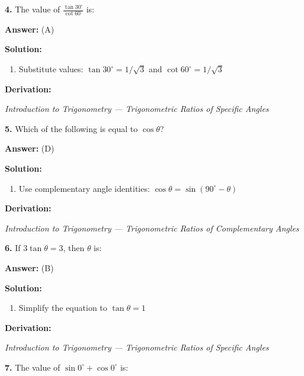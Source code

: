 \documentclass[12pt,a4paper]{exam}
\newcommand{\fitmath}[1]{%
  \sbox{\schmathbox}{$\displaystyle #1$}%
  \ifdim\wd\schmathbox>\linewidth
    \resizebox{\linewidth}{!}{\usebox{\schmathbox}}%
  \else
    \usebox{\schmathbox}%
  \fi}
\begin{document}
\begin{questions}
\question \textbf{4.} The value of $\frac{\tan 30^\circ}{\cot 60^\circ}$ is:

\textbf{Answer:}
(A)

\textbf{Solution:}
\begin{enumerate}
  \item Substitute values: $\tan 30^\circ = 1/\sqrt{3}$ and $\cot 60^\circ = 1/\sqrt{3}$
\end{enumerate}
\textbf{Derivation:}
\begin{center}
\fitmath{\frac{1/\sqrt{3}}{1/\sqrt{3}} = 1}
\end{center}
\hfill \textit{Introduction to Trigonometry — Trigonometric Ratios of Specific Angles}
\vspace{0.3cm}

\question \textbf{5.} Which of the following is equal to $\cos \theta$?

\textbf{Answer:}
(D)

\textbf{Solution:}
\begin{enumerate}
  \item Use complementary angle identities: $\cos \theta = \sin(90^\circ - \theta)$
\end{enumerate}
\textbf{Derivation:}
\begin{center}
\fitmath{\cos \theta = \sin(90^\circ - \theta)}
\end{center}
\hfill \textit{Introduction to Trigonometry — Trigonometric Ratios of Complementary Angles}
\vspace{0.3cm}

\question \textbf{6.} If $3\tan \theta = 3$, then $\theta$ is:

\textbf{Answer:}
(B)

\textbf{Solution:}
\begin{enumerate}
  \item Simplify the equation to $\tan \theta = 1$
\end{enumerate}
\textbf{Derivation:}
\begin{center}
\fitmath{\begin{aligned}
3\tan \theta = 3 \\
\implies \tan \theta = 1 \\
\implies \theta = 45^\circ
\end{aligned}}
\end{center}
\hfill \textit{Introduction to Trigonometry — Trigonometric Ratios of Specific Angles}
\vspace{0.3cm}

\question \textbf{7.} The value of $\sin 0^\circ + \cos 0^\circ$ is:


\end{questions}
\end{document}
